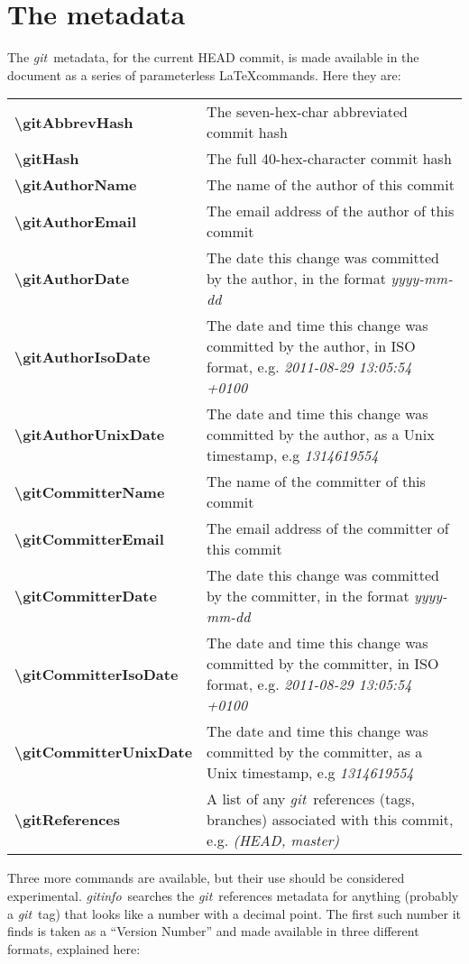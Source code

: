 \documentclass[a4paper,12pt,twoside,openany]{memoir}
\newcommand{\sfit}[1]{\textit{#1}}
\newcommand{\git}{\sfit{git}}
\newcommand{\tpname}{\sfit{gitinfo}}
\begin{document}
\section{The metadata}
The \git\ metadata, for the current HEAD commit,
is made available in the document
as a series of parameterless \LaTeX commands.
Here they are:
\vspace{0.5\baselineskip}

\noindent
\begin{tabularx}{\textwidth}{@{}>{\ttfamily\bfseries\textbackslash}lX@{}}
gitAbbrevHash&
    The seven-hex-char abbreviated commit hash
\\
gitHash&
    The full 40-hex-character commit hash
\\
gitAuthorName&
    The name of the author of this commit
\\
gitAuthorEmail&
    The email address of the author of this commit
\\
gitAuthorDate&
    The date this change was committed by the author,
    in the format \textit{yyyy-mm-dd}
\\
gitAuthorIsoDate&
    The date and time this change was committed by the author,
    in ISO format, e.g. \textit{2011-08-29 13:05:54 +0100}
\\
gitAuthorUnixDate&
    The date and time this change was committed by the author,
    as a Unix timestamp, e.g \textit{1314619554}
\\
gitCommitterName&
    The name of the committer of this commit
\\
gitCommitterEmail&
    The email address of the committer of this commit
\\
gitCommitterDate&
    The date this change was committed by the committer,
    in the format \textit{yyyy-mm-dd}
\\
gitCommitterIsoDate&
    The date and time this change was committed by the committer,
    in ISO format, e.g. \textit{2011-08-29 13:05:54 +0100}
\\
gitCommitterUnixDate&
    The date and time this change was committed by the committer,
    as a Unix timestamp, e.g \textit{1314619554}
\\
gitReferences&
    A list of any \git\ references (tags, branches) associated
    with this commit, e.g. \textit{ (HEAD, master)}
\\
\end{tabularx}

\vspace{0.5\baselineskip}
Three more commands are available, but their use should be considered
experimental. \tpname\ searches the \git\ references metadata for
anything (probably a \git\ tag) that looks like a number with a decimal point.
The first such number it finds is taken as a ``Version Number''
and made available in three different formats, explained here:
\vspace{0.5\baselineskip}
\end{document}
